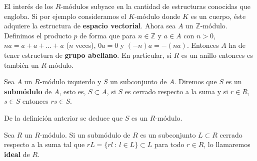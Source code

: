 \begin{ejemplo}
	El interés de los \(R\)-módulos subyace en la cantidad de estructuras conocidas que
	engloba. Si por ejemplo consideramos el \(K\)-módulo donde \(K\) es un cuerpo, éste
	adquiere la estructura de \textbf{espacio vectorial}. Ahora sea \(A\) un \(\mathbb{Z}\)-módulo.
	Definimos el producto \(p\) de forma que para \(n \in \mathbb{Z}\) y \(a \in A\) con
	\(n>0\), \(na = a + a + \ldots + a\) (\(n\) veces), \(0a=0\) y \((-n)a = -(na)\). Entonces
	\(A\) ha de tener estructura de \textbf{grupo abeliano}. En particular, si \(R\)
	es un anillo entonces es también un \(R\)-módulo.
\end{ejemplo}

\begin{definicion}
	Sea \(A\) un \(R\)-módulo izquierdo y \(S\) un subconjunto de \(A\). Diremos que \(S\)
	es un \textbf{submódulo} de \(A\), esto es, \(S \subset A\), si \(S\) es cerrado
	respecto a la suma y si \(r \in R\), \(s \in S\) entonces \(rs \in S\).
\end{definicion}
De la definición anterior se deduce que \(S\) es un \(R\)-módulo.
\begin{definicion}
	Sea \(R\) un \(R\)-módulo. Si un submódulo de \(R\) es un subconjunto \(L \subset R\)
	cerrado respecto a la suma tal que \(rL = \{rl \ : \ l \in L\} \subset L\) para
	todo \(r \in R\), lo llamaremos \textbf{ideal} de \(R\).
\end{definicion}


